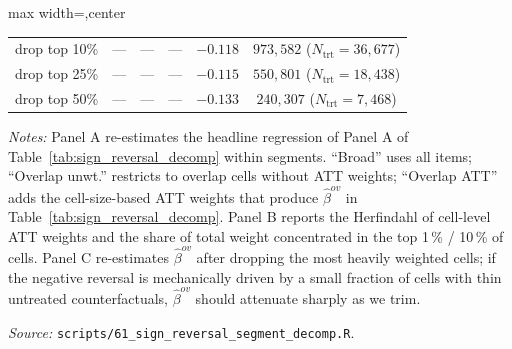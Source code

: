 \begin{table}[htbp]
\begin{adjustbox}{max width=\textwidth,center}
\begin{threeparttable}
\begin{tabular}{llrrr c}
drop top 10\% & --- & --- & --- & $-0.118$ & $973{,}582$ ($N_{\text{trt}}=36{,}677$) \\
drop top 25\% & --- & --- & --- & $-0.115$ & $550{,}801$ ($N_{\text{trt}}=18{,}438$) \\
drop top 50\% & --- & --- & --- & $-0.133$ & $240{,}307$ ($N_{\text{trt}}=7{,}468$) \\
\bottomrule
\end{tabular}
\begin{tablenotes}
\footnotesize
\item \textit{Notes:} Panel A re-estimates the headline regression of Panel A of Table~\ref{tab:sign_reversal_decomp} within segments. ``Broad'' uses all items; ``Overlap unwt.'' restricts to overlap cells without ATT weights; ``Overlap ATT'' adds the cell-size-based ATT weights that produce $\widehat\beta^{ov}$ in Table~\ref{tab:sign_reversal_decomp}. Panel B reports the Herfindahl of cell-level ATT weights and the share of total weight concentrated in the top 1\,\% / 10\,\% of cells. Panel C re-estimates $\widehat\beta^{ov}$ after dropping the most heavily weighted cells; if the negative reversal is mechanically driven by a small fraction of cells with thin untreated counterfactuals, $\widehat\beta^{ov}$ should attenuate sharply as we trim.
\item \textit{Source:} \texttt{scripts/61\_sign\_reversal\_segment\_decomp.R}.
\end{tablenotes}
\end{threeparttable}
\end{adjustbox}
\end{table}
